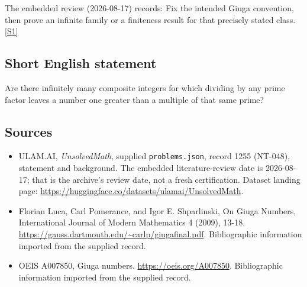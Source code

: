 \documentclass[11pt,a4paper]{article}
\newcommand{\sref}[2]{\hyperlink{source:#1:#2}{[S#2]}}
\begin{document}
The embedded review (2026-08-17) records: Fix the intended Giuga convention, then prove an infinite family or a finiteness result for that precisely stated class. \sref{1255}{1}

\subsection{Short English statement}

Are there infinitely many composite integers for which dividing by any prime factor leaves a number one greater than a multiple of that same prime?

\subsection{Sources}

{\small

\begin{itemize}

\item[\hypertarget{source:1255:1}{S1}] ULAM.AI, \emph{UnsolvedMath}, supplied \texttt{problems.json}, record 1255 (NT-048), statement and background. The embedded literature-review date is 2026-08-17; that is the archive’s review date, not a fresh certification. Dataset landing page: \url{https://huggingface.co/datasets/ulamai/UnsolvedMath}.

\item[\hypertarget{source:1255:2}{S2}] Florian Luca, Carl Pomerance, and Igor E. Shparlinski, On Giuga Numbers, International Journal of Modern Mathematics 4 (2009), 13-18. \url{https://gauss.dartmouth.edu/~carlp/giugafinal.pdf}. Bibliographic information imported from the supplied record.

\item[\hypertarget{source:1255:3}{S3}] OEIS A007850, Giuga numbers. \url{https://oeis.org/A007850}. Bibliographic information imported from the supplied record.

\end{itemize}

}

\label{end:1255}
\end{document}
